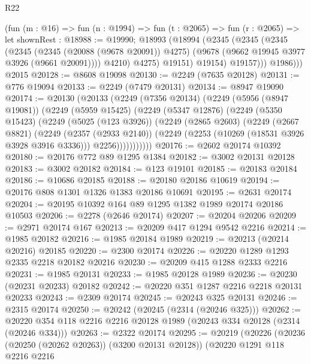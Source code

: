 \begin{lexlean}{R22}
\begin{coremodule}
            (fun (m : @16) =>
            fun (n : @1994) =>
            fun (t : @2065) =>
            fun (r : @2065) =>
            let shownRest : @18988 := @19990;
            @18993
              (@18994
                (@2345
                  (@2345
                    (@2345
                      (@2345
                        (@2345 (@20088 (@9678 @20091)) @4275)
                        (@9678 (@9662 @19945 @3977 @3926 (@9661 @20091))))
                      @4210)
                    @4275)
                  @19151)
                @19154)
              @19157)))
          @1986)))
    @2015
@20128 := @8608 @19098
@20130 := @2249 (@7635 @20128)
@20131 := @776 @19094
@20133 := @2249 (@7479 @20131)
@20134 := @8947 @19090
@20174 := @20130
    (@20133
      (@2249
        (@7356 @20134)
        (@2249
          (@5956 (@8947 @19081))
          (@2249
            (@5959 @15425)
            (@2249
              (@5347 @12876)
              (@2249
                (@5350 @15423)
                (@2249
                  (@5025 (@123 @3926))
                  (@2249
                    (@2865 @2603)
                    (@2249
                      (@2667 @8821)
                      (@2249
                        (@2357 (@2933 @2140))
                        (@2249 (@2253 (@10269 (@18531 @3926 @3928 @3916 @3336))) @2256)))))))))))
@20176 := @2602 @20174 @10392
@20180 := @20176 @772 @89 @1295 @1384
@20182 := @3002 @20131 @20128
@20183 := @3002 @20182
@20184 := @123 @19101
@20185 := @20183 @20184
@20186 := @10686 @20185
@20188 := @20180 @20186 @10619
@20194 := @20176 @808 @1301 @1326 @1383 @20186 @10691
@20195 := @2631 @20174
@20204 := @20195 @10392 @164 @89 @1295 @1382 @1989 @20174 @20186 @10503
@20206 := @2278 (@2646 @20174)
@20207 := @20204 @20206
@20209 := @2971 @20174 @167
@20213 := @20209 @417 @1294 @9542 @2216
@20214 := @1985 @20182
@20216 := @1985 @20184 @1989
@20219 := @20213 (@20214 @20216) @20185
@20220 := @2300 @20174
@20226 := @20220 @1289 @1293 @2335 @2218 @20182 @20216
@20230 := @20209 @415 @1288 @2333 @2216
@20231 := @1985 @20131
@20233 := @1985 @20128 @1989
@20236 := @20230 (@20231 @20233) @20182
@20242 := @20220 @351 @1287 @2216 @2218 @20131 @20233
@20243 := @2309 @20174
@20245 := @20243 @325 @20131
@20246 := @2315 @20174
@20250 := @20242 (@20245 (@2314 (@20246 @325)))
@20262 := @20220 @354 @118 @2216 @2216 @20128 @1989 (@20243 @334 @20128 (@2314 (@20246 @334)))
@20263 := @2322 @20174
@20295 := @20219
    (@20226
      (@20236 (@20250 (@20262 @20263)) (@3200 @20131 @20128))
      (@20220
        @1291
        @118
        @2216
        @2216

\end{coremodule}
\end{lexlean}
